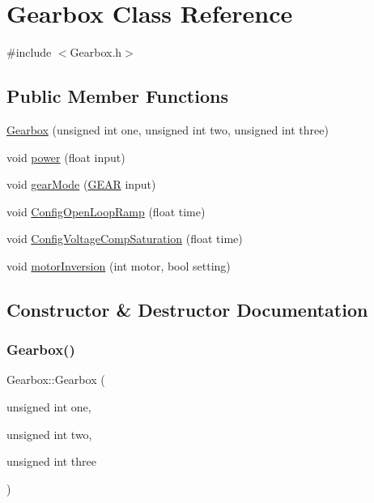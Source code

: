 \hypertarget{classGearbox}{}\section{Gearbox Class Reference}
\label{classGearbox}


{\ttfamily \#include $<$Gearbox.\+h$>$}

\subsection*{Public Member Functions}
\begin{DoxyCompactItemize}
\item 
\hyperlink{classGearbox_a4f12b75e87b2cb04cb23da042570d3e4}{Gearbox} (unsigned int one, unsigned int two, unsigned int three)
\item 
void \hyperlink{classGearbox_a18c2ea864caee36934286130b89ca310}{power} (float input)
\item 
void \hyperlink{classGearbox_aa8287282dff09b8392929a48c046d2cd}{gear\+Mode} (\hyperlink{Gearbox_8h_af8596e33b77fa343a7c7f9275df5e7c4}{G\+E\+AR} input)
\item 
void \hyperlink{classGearbox_a3773e045e94a3a83af6fea4997244ddf}{Config\+Open\+Loop\+Ramp} (float time)
\item 
void \hyperlink{classGearbox_a8265e628f91ba9eeda7545d4b74d828b}{Config\+Voltage\+Comp\+Saturation} (float time)
\item 
void \hyperlink{classGearbox_a50c38e09098353b2b250ba9835593d1f}{motor\+Inversion} (int motor, bool setting)
\end{DoxyCompactItemize}


\subsection{Constructor \& Destructor Documentation}
\mbox{\label{classGearbox_a4f12b75e87b2cb04cb23da042570d3e4}} 
\subsubsection{\texorpdfstring{Gearbox()}{Gearbox()}}
{\footnotesize\ttfamily Gearbox\+::\+Gearbox (\begin{DoxyParamCaption}\item[{unsigned int}]{one,  }\item[{unsigned int}]{two,  }\item[{unsigned int}]{three }\end{DoxyParamCaption})}



